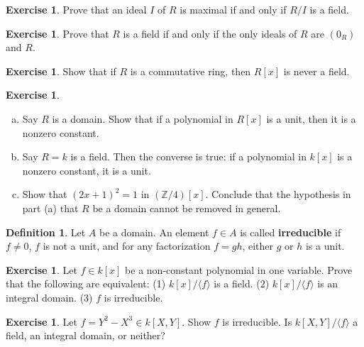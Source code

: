 \documentclass{amsart}
\theoremstyle{plain}
\theoremstyle{definition}
\newtheorem{definition}{Definition}[section]
\newtheorem{exercise}[theorem]{Exercise}
\theoremstyle{definition}
\newcommand{\defining}[1]{\textbf{#1}}
\newcommand{\Z}{\mathbb{Z}}
\begin{document}
\begin{exercise}
Prove that an ideal $I$ of $R$ is maximal if and only if $R/I$ is a field.
\end{exercise}

\begin{exercise}
Prove that $R$ is a field if and only
if the only ideals of $R$ are $(0_{R})$ and $R$.
\end{exercise}

\begin{exercise}
Show that if $R$ is a commutative ring, then $R[x]$ is never a field.
\end{exercise}

\begin{exercise} 

\begin{enumerate}[a.]

\item Say $R$ is a domain. Show that if a polynomial in $R[x]$ is a unit, then it is a nonzero constant.

\item Say $R=k$ is a field. Then the converse is true: if a polynomial in $k[x]$ is a nonzero constant,
it is a unit.

\item Show that $(2x+1)^2 = 1$ in $(\Z/4)[x]$.
Conclude that the hypothesis in part (a) that $R$ be a domain cannot be removed in general.
\end{enumerate}
\end{exercise}


\begin{definition}
Let $A$ be a domain. An element $f \in A$ is called \defining{irreducible}
if $f \neq 0$, $f$ is not a unit, and for any factorization $f = gh$, either $g$ or $h$ is a unit.
\end{definition}

\begin{exercise}
Let $f \in k[x]$ be a non-constant polynomial in one variable.
Prove that the following are equivalent:
(1) $k[x] / \langle f \rangle$ is a field.
(2) $k[x] / \langle f \rangle$ is an integral domain.
(3) $f$ is irreducible.
\end{exercise}


\begin{exercise}
Let $f = Y^2 - X^3 \in k[X,Y]$.
Show $f$ is irreducible.
Is $k[X,Y] / \langle f \rangle$ a field, an integral domain, or neither?
\end{exercise}
\end{document}
